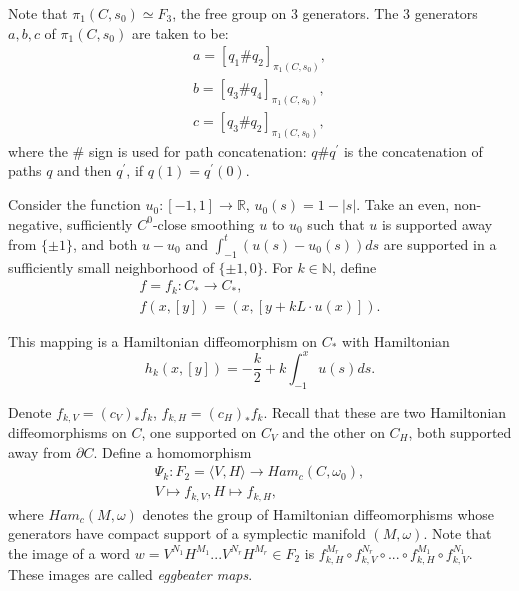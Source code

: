 \documentclass[11pt]{article}
\newenvironment{myequation}
    {
        \begin{equation*}
        \begin{gathered}
    }
    { 
        \end{gathered} 
        \end{equation*}
    }
\newcommand{\R}{\mathbb{R}}
\newcommand{\N}{\mathbb{N}}
\begin{document}
            Note that $\pi_1(C,s_0) \simeq F_3$, the free group on 3 generators. The 3 generators $a,b,c$ of $\pi_1(C,s_0)$ are taken to be:
            \begin{myequation}
            a = [q_1 \# q_2]_{\pi_1(C,s_0)} , \\
            b = [q_3 \# q_4]_{\pi_1(C,s_0)} , \\
            c = [q_3 \# q_2]_{\pi_1(C,s_0)} ,
            \end{myequation}
            where the $\#$ sign is used for path concatenation: $q\#q^\prime$ is the concatenation of paths $q$ and then $q^\prime$, if $q(1) = q^\prime(0)$.
            
            Consider the function $u_0: [-1,1] \to \R$, $u_0(s) = 1 - |s|$. Take an even, non-negative, sufficiently $C^0$-close smoothing $u$ to $u_0$ such that $u$ is supported away from $\{\pm 1\}$, and both $u-u_0$ and $\int_{-1}^t (u(s)-u_0(s)) ds$ are supported in a sufficiently small neighborhood of $\{\pm 1, 0\}$. For $k \in \N$, define
            \begin{myequation}
                f = f_k: C_* \to C_* , \\
                f(x,[y]) = (x,[y + k L \cdot u(x)]) .
            \end{myequation}
            
            This mapping is a Hamiltonian diffeomorphism on $C_*$ with Hamiltonian
            \[
                h_k(x,[y]) = -\frac{k}{2} + k \int_{-1}^x u(s) ds .
            \]
            
            Denote $f_{k,V} = (c_V)_* f_k$, $f_{k,H} = (c_H)_* f_k$. Recall that these are two Hamiltonian diffeomorphisms on $C$, one supported on $C_V$ and the other on $C_H$, both supported away from $\partial C$. Define a homomorphism
            \begin{myequation}
                \Psi_k: F_2 = \langle V,H \rangle \to Ham_c(C,\omega_0) ,\\
                V \mapsto f_{k,V}, H \mapsto f_{k,H} ,
            \end{myequation}
            where $Ham_c(M,\omega)$ denotes the group of Hamiltonian diffeomorphisms whose generators have compact support of a symplectic manifold $(M,\omega)$.
            Note that the image of a word $w = V^{N_1} H^{M_1} ... V^{N_r} H^{M_r} \in F_2$ is $f_{k,H}^{M_r} \circ f_{k,V}^{N_r} \circ ... \circ f_{k,H}^{M_1} \circ f_{k,V}^{N_1}$. These images are called \textit{eggbeater maps}.
            
\end{document}
